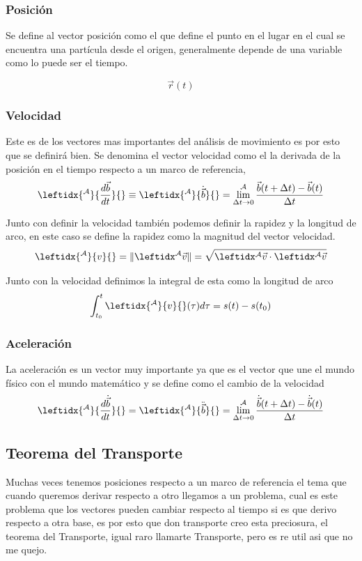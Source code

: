 \subsubsection{Posición}

Se define al vector posición como el que define el punto en el lugar en el cual se encuentra una partícula desde el origen, generalmente depende de una variable como lo puede ser el tiempo.

$$\Vec{r}(t)$$


\subsubsection{Velocidad}
Este es de los vectores mas importantes del análisis de movimiento es por esto que se definirá bien.
Se denomina el vector velocidad como el la derivada de la posición en el tiempo respecto a un marco de referencia,
\begin{equation*}
\leftidx{^\mathcal{A}}{\frac{d\vec{b}}{dt}}{} \equiv \leftidx{^\mathcal{A}}{\dot{\vec{b}}}{} = \lim^{\mathcal{A}}\limits _{\Delta t\to 0} \frac{\vec{b}(t+\Delta t) - \vec{b}(t)}{\Delta t}
\end{equation*}


Junto con definir la velocidad también podemos definir la rapidez y la longitud de arco, en este caso se define la rapidez como la magnitud del vector velocidad.
$$\leftidx{^\mathcal{A}}{v}{}=\|\marc{}{A}\Vec{v}\|=\sqrt{\marc{}{A}\Vec{v}\cdot\marc{}{A}\Vec{v}}$$

Junto con la velocidad definimos la integral de esta como la longitud de arco
$$\int_{t_0}^{t}\leftidx{^\mathcal{A}}{v}{}(\tau) d\tau=s(t)-s(t_0)$$

\subsubsection{Aceleración}
La aceleración es un vector muy importante ya que es el vector que une el mundo físico con el mundo matemático y se define como el cambio de la velocidad 
\begin{equation*}
\leftidx{^\mathcal{A}}{\frac{d\dot{\vec{b}}}{dt}}{} = \leftidx{^\mathcal{A}}{\ddot{\vec{b}}}{} = \lim^{\mathcal{A}}\limits _{\Delta t\to 0} \frac{\dot{ \vec{b}}(t+\Delta t) - \dot{\vec{b}}(t)}{\Delta t}
\end{equation*}


\subsection{Teorema del Transporte}
Muchas veces tenemos posiciones respecto a un marco de referencia el tema que cuando queremos derivar respecto a otro llegamos a un problema, cual es este problema que los vectores pueden cambiar respecto al tiempo si es que derivo respecto a otra base, es por esto que don transporte creo esta preciosura, el teorema del Transporte, igual raro llamarte Transporte, pero es re util asi que no me quejo.\\

